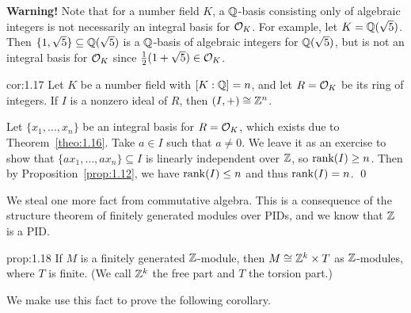 {\bf Warning!} Note that for a number field $K$, a $\mathbb{Q}$-basis consisting only of 
algebraic integers is not necessarily an integral basis for ${\cal O}_K$. For 
example, let $K = \mathbb{Q}(\sqrt{5})$. Then $\{1, \sqrt{5}\} \subseteq 
\mathbb{Q}(\sqrt{5})$ is a $\mathbb{Q}$-basis of algebraic integers for $\mathbb{Q}(\sqrt{5})$, 
but is not an integral basis for ${\cal O}_K$ since $\frac12(1+\sqrt{5}) \in 
{\cal O}_K$. 

\begin{cor}{cor:1.17}
    Let $K$ be a number field with $[K : \mathbb{Q}] = n$, and let $R = {\cal O}_K$ be 
    its ring of integers. If $I$ is a nonzero ideal of $R$, then 
    $(I, +) \cong \mathbb{Z}^n$. 
\end{cor}\vspace{-0.15cm}
\begin{pf}
    Let $\{x_1, \dots, x_n\}$ be an integral basis for $R = {\cal O}_K$, 
    which exists due to Theorem~\ref{theo:1.16}. Take $a \in I$ such that 
    $a \neq 0$. We leave it as an exercise to show that 
    $\{ax_1, \dots, ax_n\} \subseteq I$ is linearly independent over $\mathbb{Z}$, 
    so $\operatorname{rank}(I) \geq n$. Then by Proposition~\ref{prop:1.12}, we have 
    $\operatorname{rank}(I) \leq n$ and thus $\operatorname{rank}(I) = n$. \qed 
\end{pf}\vspace{-0.25cm}

We steal one more fact from commutative algebra. This is a consequence of the 
structure theorem of finitely generated modules over PIDs, and we know that 
$\mathbb{Z}$ is a PID.

\begin{prop}{prop:1.18}
    If $M$ is a finitely generated $\mathbb{Z}$-module, then $M \cong \mathbb{Z}^k \times T$ 
    as $\mathbb{Z}$-modules, where $T$ is finite. (We call $\mathbb{Z}^k$ the free part and $T$ the 
    torsion part.)
\end{prop}\vspace{-0.15cm}

We make use this fact to prove the following corollary.

